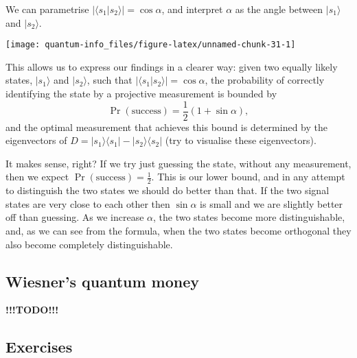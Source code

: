 \documentclass[fleqn]{article}
\begin{document}
We can parametrise \(|\langle s_1|s_2\rangle| = \cos\alpha\), and interpret \(\alpha\) as the angle between \(|s_1\rangle\) and \(|s_2\rangle\).

\begin{center}\texttt{[image: quantum-info\_files/figure-latex/unnamed-chunk-31-1]} \end{center}

This allows us to express our findings in a clearer way: given two equally likely states, \(|s_1\rangle\) and \(|s_2\rangle\), such that \(|\langle s_1|s_2\rangle| = \cos\alpha\), the probability of correctly identifying the state by a projective measurement is bounded by
\[
 \Pr (\text{success})
 = \frac12(1 + \sin\alpha),
\]
and the optimal measurement that achieves this bound is determined by the eigenvectors of \(D = |s_1\rangle\langle s_1|-|s_2\rangle\langle s_2|\) (try to visualise these eigenvectors).

It makes sense, right?
If we try just guessing the state, without any measurement, then we expect \(\Pr (\text{success}) = \frac12\).
This is our lower bound, and in any attempt to distinguish the two states we should do better than that.
If the two signal states are very close to each other then \(\sin\alpha\) is small and we are slightly better off than guessing.
As we increase \(\alpha\), the two states become more distinguishable, and, as we can see from the formula, when the two states become orthogonal they also become completely distinguishable.

\hypertarget{wiesners-quantum-money}{%
\subsection{Wiesner's quantum money}\label{wiesners-quantum-money}}

\textbf{!!!TODO!!!}

\hypertarget{exercises-6}{%
\subsection{Exercises}\label{exercises-6}}
\end{document}
